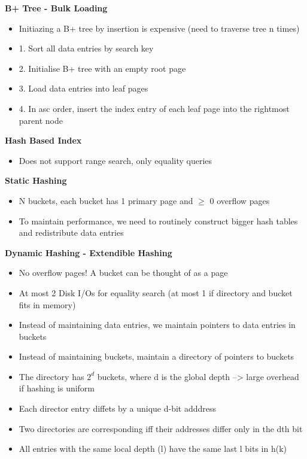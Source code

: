 \documentclass[10pt, landscape]{article}
\begin{document}
\begin{multicols}{4}
\textbf{B+ Tree - Bulk Loading}
\begin{itemize}
  \item Initiazing a B+ tree by insertion is expensive (need to traverse tree n times)
  \item 1. Sort all data entries by search key
  \item 2. Initialise B+ tree with an empty root page
  \item 3. Load data entries into leaf pages 
  \item 4. In asc order, insert the index entry of each leaf page into the rightmost parent node
\end{itemize}


\textbf{Hash Based Index}
\begin{itemize}
  \item Does not support range search, only equality queries
\end{itemize}

\textbf{Static Hashing}
\begin{itemize}
  \item N buckets, each bucket has 1 primary page and $\geq$ 0 overflow pages
  \item To maintain performance, we need to routinely construct bigger hash tables and redistribute data entries
\end{itemize}

\textbf{Dynamic Hashing - Extendible Hashing}
\begin{itemize}
  \item No overflow pages! A bucket can be thought of as a page
  \item At most 2 Disk I/Os for equality search (at most 1 if directory and bucket fits in memory)
  \item Instead of maintaining data entries, we maintain pointers to data entries in buckets
  \item Instead of maintaining buckets, maintain a directory of pointers to buckets
  \item The directory has $2^d$ buckets, where d is the global depth --> large overhead if hashing is uniform
  \item Each director entry diffets by a unique d-bit adddress
  \item Two directories are corresponding iff their addresses differ only in the dth bit
  \item All entries with the same local depth (l) have the same last l bits in h(k)
\end{itemize}


\end{multicols}
\end{document}

